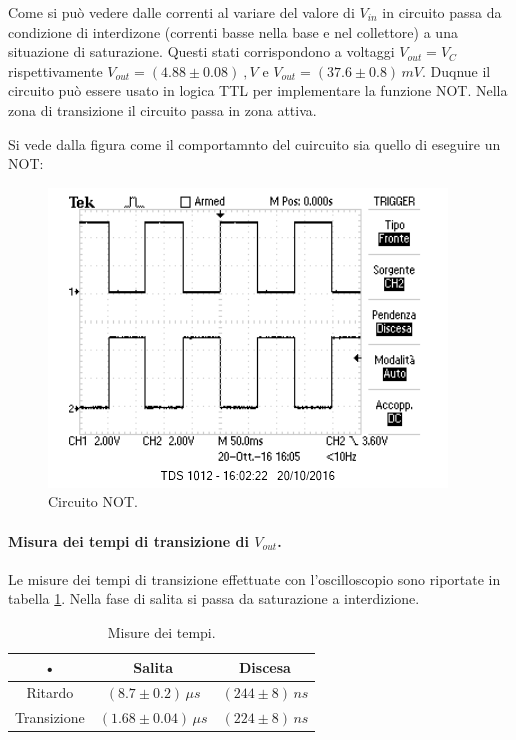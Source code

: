 \documentclass[10pt,a4paper]{article}
\begin{document}
Come si può vedere dalle correnti al variare del valore di $V_{in}$ in circuito passa da condizione di interdizone (correnti basse nella base e nel collettore) a una situazione di saturazione. Questi stati corrispondono a voltaggi $V_{out} = V_C$ rispettivamente $V_{out} = (4.88\pm0.08) \ ,V$ e $V_{out} = (37.6\pm0.8)\, mV$. Duqnue il circuito può essere usato in logica TTL per implementare la funzione NOT.
Nella zona di transizione il circuito passa in zona attiva.

Si vede dalla figura come il comportamnto del cuircuito sia quello di eseguire un NOT:
\begin{figure}[!htb]
  \centering
  \includegraphics[scale=0.7]{not.png} 
\caption{Circuito NOT.} 
\end{figure} 


\paragraph{Misura dei tempi di transizione di $V_{out}$.}
Le misure dei tempi di transizione effettuate con l'oscilloscopio sono riportate in tabella \ref{tempi1}.
Nella fase di salita si passa da saturazione a interdizione.

\begin{table}[!htb]\centering
\begin{tabular}{|c|c|c|}
\hline 
• & Salita & Discesa \\ 
\hline 
Ritardo & $(8.7\pm0.2)\, \mu s$ & $(244\pm8) \, ns$ \\ 
\hline 
Transizione & $(1.68\pm0.04)\, \mu s$ & $(224\pm8) \, ns$ \\ 
\hline 
\end{tabular} 
\caption{Misure dei tempi.} 
\label{tempi1}
\end{table}
\end{document}
